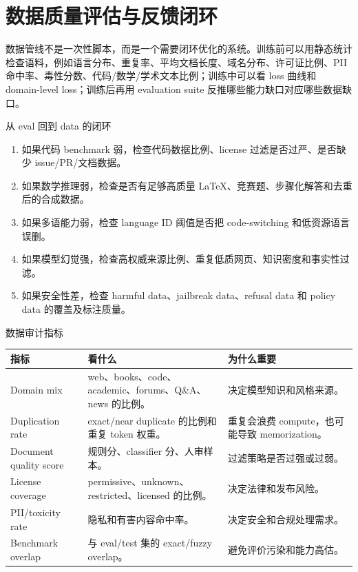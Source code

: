 \section{数据质量评估与反馈闭环}

数据管线不是一次性脚本，而是一个需要闭环优化的系统。训练前可以用静态统计检查语料，例如语言分布、重复率、平均文档长度、域名分布、许可证比例、PII 命中率、毒性分数、代码/数学/学术文本比例；训练中可以看 loss 曲线和 domain-level loss；训练后再用 evaluation suite 反推哪些能力缺口对应哪些数据缺口。

\begin{importantbox}{从 eval 回到 data 的闭环}
\begin{enumerate}
    \item 如果代码 benchmark 弱，检查代码数据比例、license 过滤是否过严、是否缺少 issue/PR/文档数据。
    \item 如果数学推理弱，检查是否有足够高质量 LaTeX、竞赛题、步骤化解答和去重后的合成数据。
    \item 如果多语能力弱，检查 language ID 阈值是否把 code-switching 和低资源语言误删。
    \item 如果模型幻觉强，检查高权威来源比例、重复低质网页、知识密度和事实性过滤。
    \item 如果安全性差，检查 harmful data、jailbreak data、refusal data 和 policy data 的覆盖及标注质量。
\end{enumerate}
\end{importantbox}

\begin{knowledgebox}{数据审计指标}
\begin{longtable}{L{0.22\textwidth}L{0.34\textwidth}L{0.34\textwidth}}
\toprule
指标 & 看什么 & 为什么重要 \\
\midrule
\endhead
Domain mix & web、books、code、academic、forums、Q\&A、news 的比例。 & 决定模型知识和风格来源。 \\
Duplication rate & exact/near duplicate 的比例和重复 token 权重。 & 重复会浪费 compute，也可能导致 memorization。 \\
Document quality score & 规则分、classifier 分、人审样本。 & 过滤策略是否过强或过弱。 \\
License coverage & permissive、unknown、restricted、licensed 的比例。 & 决定法律和发布风险。 \\
PII/toxicity rate & 隐私和有害内容命中率。 & 决定安全和合规处理需求。 \\
Benchmark overlap & 与 eval/test 集的 exact/fuzzy overlap。 & 避免评价污染和能力高估。 \\
\bottomrule
\end{longtable}
\end{knowledgebox}

